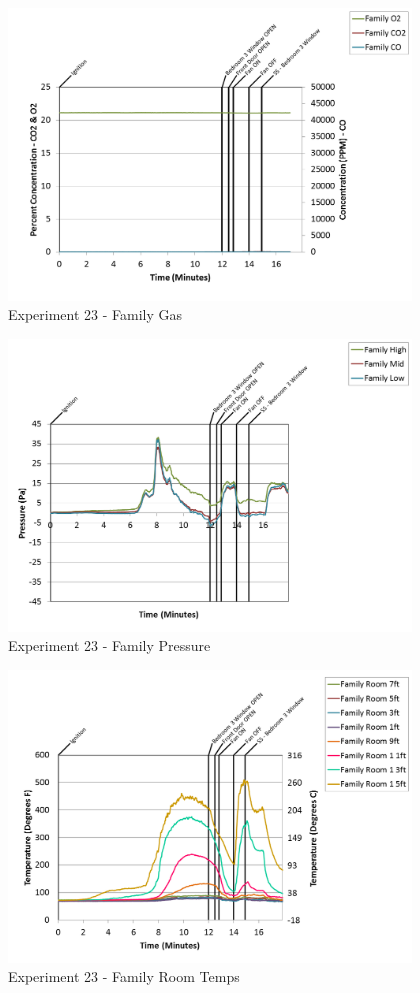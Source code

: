 \documentclass{article}
\begin{document}
\begin{appendices}
\clearpage

\begin{figure}[h!]
	\centering
	\includegraphics[height=3.05in]{0_Images/Results_Charts/Exp_23_Charts/FamilyGas.png}
	\caption{Experiment 23 - Family Gas}
\end{figure}


\begin{figure}[h!]
	\centering
	\includegraphics[height=3.05in]{0_Images/Results_Charts/Exp_23_Charts/FamilyPressure.png}
	\caption{Experiment 23 - Family Pressure}
\end{figure}

\clearpage

\begin{figure}[h!]
	\centering
	\includegraphics[height=3.05in]{0_Images/Results_Charts/Exp_23_Charts/FamilyRoomTemps.png}
	\caption{Experiment 23 - Family Room Temps}
\end{figure}



\end{appendices}
\end{document}
